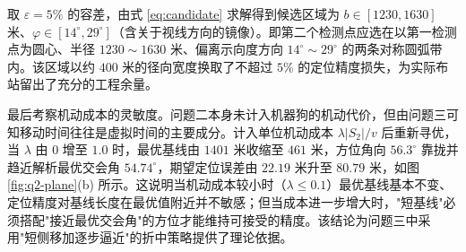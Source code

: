 取 $\varepsilon=5\%$ 的容差，由式 \eqref{eq:candidate} 求解得到候选区域为 $b\in[1230,1630]$ 米、$\varphi\in[14^\circ,29^\circ]$（含关于视线方向的镜像）。即第二个检测点应选在以第一检测点为圆心、半径 $1230\sim1630$ 米、偏离示向度方向 $14^\circ\sim29^\circ$ 的两条对称圆弧带内。该区域以约 $400$ 米的径向宽度换取了不超过 $5\%$ 的定位精度损失，为实际布站留出了充分的工程余量。

最后考察机动成本的灵敏度。问题二本身未计入机器狗的机动代价，但由问题三可知移动时间往往是虚拟时间的主要成分。计入单位机动成本 $\lambda\lvert S_2\rvert/v$ 后重新寻优，当 $\lambda$ 由 $0$ 增至 $1.0$ 时，最优基线由 $1401$ 米收缩至 $461$ 米，方位角向 $56.3^\circ$ 靠拢并趋近解析最优交会角 $54.74^\circ$，期望定位误差由 $22.19$ 米升至 $80.79$ 米，如图 \ref{fig:q2-plane}(b) 所示。这说明当机动成本较小时（$\lambda\le0.1$）最优基线基本不变、定位精度对基线长度在最优值附近并不敏感；但当成本进一步增大时，"短基线"必须搭配"接近最优交会角"的方位才能维持可接受的精度。该结论为问题三中采用"短侧移加逐步逼近"的折中策略提供了理论依据。
